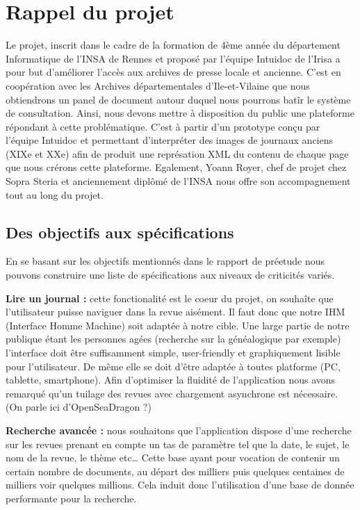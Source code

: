 \section{Rappel du projet}
\label{sec:rapp}

Le projet, inscrit dans le cadre de la formation de 4ème année du département Informatique de l’INSA de Rennes et proposé par l’équipe Intuidoc de l’Irisa a pour but d’améliorer l’accès aux archives de presse locale et ancienne. C’est en coopération avec les Archives départementales d’Ile-et-Vilaine que nous obtiendrons un panel de document autour duquel nous pourrons batîr le système de consultation. Ainsi, nous devons mettre à disposition du public une plateforme répondant à cette problématique.
C’est à partir d’un prototype conçu par l’équipe Intuidoc et permettant d’interpréter des images de journaux anciens (XIXe et XXe) afin de produit une représation XML du contenu de chaque page que nous crérons cette plateforme.
Egalement, Yoann Royer, chef de projet chez Sopra Steria et anciennement diplômé de l’INSA nous offre son accompagnement tout au long du projet. 

	\subsection{Des objectifs aux spécifications}
	\label{sec:objectifs}
	En se basant sur les objectifs mentionnés dans le rapport de préetude nous pouvons construire une liste de spécifications aux niveaux de criticités variés.
	

	\textbf{Lire un journal :} cette fonctionalité est le coeur du projet, on souhaîte que l’utilisateur puisse naviguer dans la revue aisément. Il faut donc que notre IHM (Interface Homme Machine) soit adaptée à notre cible. Une large partie de notre publique étant les personnes agées (recherche sur la généalogique par exemple) l’interface doit être suffisamment simple, user-friendly et graphiquement lisible pour l’utilisateur. De même elle se doit d’être adaptée à toutes platforme (PC, tablette, smartphone). Afin d’optimiser la fluidité de l’application nous avons remarqué qu’un tuilage des revues avec chargement asynchrone est nécessaire. (On parle ici d’OpenSeaDragon ?)
	

	\textbf{Recherche avancée :} nous souhaitons que l’application dispose d’une recherche sur les revues prenant en compte un tas de paramètre tel que la date, le sujet, le nom de la revue, le thème etc… Cette base ayant pour vocation de contenir un certain nombre de documents, au départ des milliers puis quelques centaines de milliers voir quelques millions. Cela induit donc l’utilisation d’une base de donnée performante pour la recherche.
	

